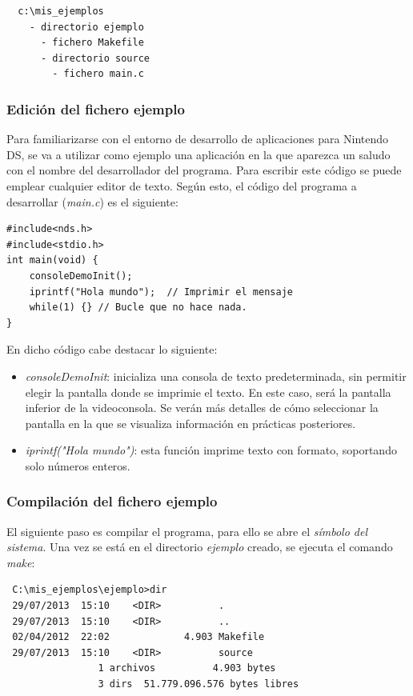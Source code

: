 {\scriptsize
 \begin{verbatim}
  c:\mis_ejemplos
    - directorio ejemplo
      - fichero Makefile
      - directorio source
        - fichero main.c
\end{verbatim}
}

\subsubsection{Edición del fichero ejemplo}
Para familiarizarse con el entorno de desarrollo de aplicaciones para Nintendo DS, se va a utilizar como ejemplo una aplicación en la que aparezca un saludo con el nombre del desarrollador del programa. Para escribir este código se puede emplear cualquier editor de texto. Según esto, el código del programa a desarrollar (\textit{main.c}) es el siguiente:

\begin{lstlisting}
#include<nds.h>
#include<stdio.h>
int main(void) {
    consoleDemoInit();
    iprintf("Hola mundo");  // Imprimir el mensaje 
    while(1) {} // Bucle que no hace nada.     
}
\end{lstlisting}

En dicho código cabe destacar lo siguiente:
\begin{itemize}
\item \textit{consoleDemoInit}: inicializa una consola de texto predeterminada, sin permitir elegir la pantalla donde se imprimie el texto. En este caso, será la pantalla inferior de la videoconsola. Se verán más detalles de cómo seleccionar la pantalla en la que se visualiza información en prácticas posteriores. 
%
\item  \textit{iprintf("Hola mundo")}: esta función imprime texto con formato, soportando solo números enteros.
\end{itemize}

\subsubsection{Compilación del fichero ejemplo}
El siguiente paso es compilar el programa, para ello se abre el \textit{símbolo del sistema}. Una vez se está en el directorio \textit{ejemplo} creado, se ejecuta el comando \textit{make}:

{\scriptsize
\begin{verbatim}
 C:\mis_ejemplos\ejemplo>dir
 29/07/2013  15:10    <DIR>          .
 29/07/2013  15:10    <DIR>          ..
 02/04/2012  22:02             4.903 Makefile
 29/07/2013  15:10    <DIR>          source
                1 archivos          4.903 bytes
                3 dirs  51.779.096.576 bytes libres
 \end{verbatim}
}

